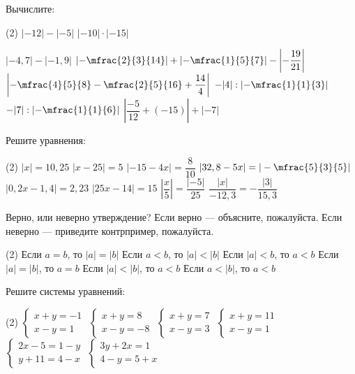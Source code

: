 \begin{class}[number=5]
	\begin{listofex}
		\item Вычислите:
		\begin{tasks}(2)
			\task \( |-12|-|-5| \)
			\task \( |-10| \cdot |-15| \)
			
			\task \( |-4,7|-|-1,9| \)
			\task \( \left| -\mfrac{ 2 }{ 3 }{14} \right| + \left| -\mfrac{ 1 }{5}{ 7 } \right| - \left| -\dfrac{ 19 }{21  } \right| \)
			\task \( \left| -\mfrac{ 4}{5 }{8 }-\mfrac{ 2}{5 }{16 } + \dfrac{ 14 }{ 4 } \right| \)
			\task \( -|4|:\left| -\mfrac{ 1}{1 }{3 } \right| \)
			\task \( -|7|:\left| -\mfrac{ 1}{1 }{6 } \right| \)
			\task \( \left| \dfrac{ -5 }{ 12 } + (-15) \right| + |-7| \)
		\end{tasks}
		\item Решите уравнения:
		\begin{tasks}(2)
			\task \( |x|=10,25 \)
			\task \( |x-25|=5 \)
			\task \( |-15-4x|=\dfrac{ 8 }{ 10 } \)
			\task \( |32,8-5x|=|-\mfrac{5 }{3 }{ 5}| \)
			\task \( |0,2x-1,4|=2,23 \)
			\task \( |25x-14|=15 \)
			\task \( \left| \dfrac{ x }{ 5 } \right|=\dfrac{ |-5| }{ 25 } \)
			\task \( \dfrac{ |x| }{ -12,3 }=-\dfrac{ |3| }{ 15,3 } \)
		\end{tasks}
		\item Верно, или неверно утверждение? Если верно --- объясните, пожалуйста. Если неверно --- приведите контрпример, пожалуйста.
		\begin{tasks}(2)
			\task Если \( a=b \), то \( |a|=|b| \)
			\task Если \( a<b \), то \( |a|<|b| \)
			\task Если \(|a|<b \), то \( a<b \)
			\task Если \( |a|=|b| \), то \( a=b \)
			\task Если \( |a|<|b| \), то \( a<b \)
			\task Если \( a<|b| \), то \( a<b \)
		\end{tasks}
		\item Решите системы уравнений: %
		\begin{tasks}(2)
			\task \( \begin{cases} x+y=-1 \\ x-y=1 \end{cases} \)
			\task \( \begin{cases} x+y=8 \\ x-y=-8 \end{cases} \)
			\task \( \begin{cases} x+y=7 \\ x-y=3 \end{cases} \)
			\task \( \begin{cases} x+y=11 \\ x-y=1 \end{cases} \)
			\task \( \begin{cases} 2x-5=1-y \\ y+11=4-x \end{cases} \)
			\task \( \begin{cases} 3y+2x=1 \\ 4-y=5+x \end{cases} \)
		\end{tasks}
	\end{listofex}
\end{class}


